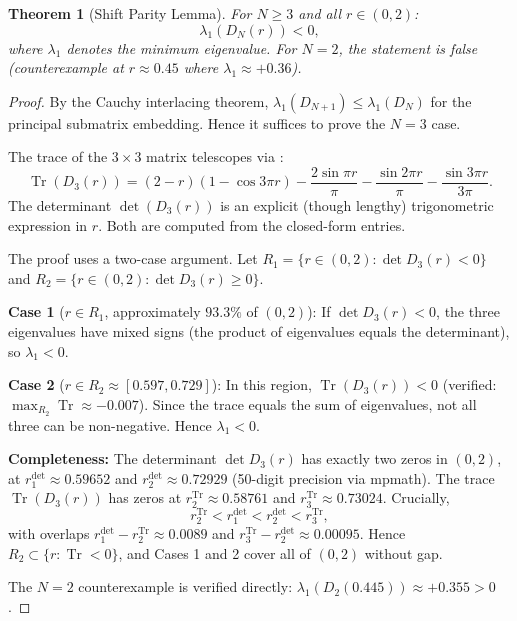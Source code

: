 \documentclass[12pt,a4paper]{article}
\newtheorem{theorem}{Theorem}[section]
\theoremstyle{definition}
\theoremstyle{remark}
\begin{document}
\begin{theorem}[Shift Parity Lemma]
\label{thm:shift-parity}
For $N \geq 3$ and all $r \in (0, 2)$:
\[
  \lambda_1(D_N(r)) < 0,
\]
where $\lambda_1$ denotes the minimum eigenvalue. For $N = 2$, the statement is false (counterexample at $r \approx 0.45$ where $\lambda_1 \approx +0.36$).
\end{theorem}

\begin{proof}
By the Cauchy interlacing theorem, $\lambda_1(D_{N+1}) \leq \lambda_1(D_N)$ for the principal submatrix embedding. Hence it suffices to prove the $N = 3$ case.

The trace of the $3 \times 3$ matrix telescopes via :
\[
  \operatorname{Tr}(D_3(r)) = (2-r)(1 - \cos 3\pi r) - \frac{2\sin\pi r}{\pi} - \frac{\sin 2\pi r}{\pi} - \frac{\sin 3\pi r}{3\pi}.
\]
The determinant $\det(D_3(r))$ is an explicit (though lengthy) trigonometric expression in $r$. Both are computed from the closed-form entries.

The proof uses a two-case argument. Let $R_1 = \{r \in (0,2) : \det D_3(r) < 0\}$ and $R_2 = \{r \in (0,2) : \det D_3(r) \geq 0\}$.

\medskip
\noindent\textbf{Case 1} ($r \in R_1$, approximately $93.3\%$ of $(0,2)$):
If $\det D_3(r) < 0$, the three eigenvalues have mixed signs (the product of eigenvalues equals the determinant), so $\lambda_1 < 0$.

\medskip
\noindent\textbf{Case 2} ($r \in R_2 \approx [0.597, 0.729]$):
In this region, $\operatorname{Tr}(D_3(r)) < 0$ (verified: $\max_{R_2}\operatorname{Tr} \approx -0.007$). Since the trace equals the sum of eigenvalues, not all three can be non-negative. Hence $\lambda_1 < 0$.

\medskip
\noindent\textbf{Completeness:}
The determinant $\det D_3(r)$ has exactly two zeros in $(0,2)$, at $r_1^{\det} \approx 0.59652$ and $r_2^{\det} \approx 0.72929$ (50-digit precision via mpmath). The trace $\operatorname{Tr}(D_3(r))$ has zeros at $r_2^{\operatorname{Tr}} \approx 0.58761$ and $r_3^{\operatorname{Tr}} \approx 0.73024$. Crucially,
\[
  r_2^{\operatorname{Tr}} < r_1^{\det} < r_2^{\det} < r_3^{\operatorname{Tr}},
\]
with overlaps $r_1^{\det} - r_2^{\operatorname{Tr}} \approx 0.0089$ and $r_3^{\operatorname{Tr}} - r_2^{\det} \approx 0.00095$.
Hence $R_2 \subset \{r : \operatorname{Tr} < 0\}$, and Cases 1 and 2 cover all of $(0,2)$ without gap.

The $N = 2$ counterexample is verified directly: $\lambda_1(D_2(0.445)) \approx +0.355 > 0$.
\end{proof}
\end{document}
